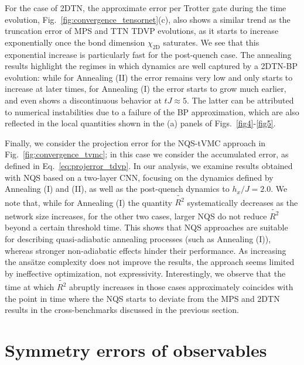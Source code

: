 \documentclass[aps,pra,reprint,amssymb,superscriptaddress]{revtex4-2}
\begin{document}
For the case of 2DTN, the approximate error per Trotter gate during the time evolution, Fig.~\ref{fig:convergence_tensornet}(c), 
also shows a similar trend as the truncation error of MPS and TTN TDVP evolutions, as it starts to increase exponentially once the bond dimension $\chi_\text{2D}$ saturates. We see that this exponential increase is particularly fast for the post-quench case. The annealing results highlight the regimes in which dynamics are well captured by a 2DTN-BP evolution: while for 
Annealing (II) the error remains very low and only starts to increase at later times, for Annealing (I) the error starts to grow much earlier, and even shows a discontinuous behavior at $tJ\approx 5$. The latter can be attributed to numerical instabilities due to a failure of the BP approximation, which are also reflected in the local quantities shown in the (a) panels of Figs.~\ref{fig4}-\ref{fig5}.

Finally, we consider the projection error for the NQS-tVMC approach in Fig.~\ref{fig:convergence_tvmc}; in this case we consider the accumulated error, as defined in Eq.~\eqref{eq:projerror_tdvp}.
In our analysis, we examine results obtained with NQS based on a two-layer CNN, focusing on the dynamics defined by Annealing (I) and (II), as well as the post-quench dynamics to $h_x/J = 2.0$. 
We note that, while for Annealing (I) the quantity $\tilde{R^2}$ systematically decreases as the network size increases, for the other two cases, larger NQS do not reduce $\tilde{R^2}$ beyond a certain threshold time. 
This shows that NQS approaches are suitable for describing quasi-adiabatic annealing processes (such as Annealing (I)), whereas stronger non-adiabatic effects hinder their performance. 
%
As increasing the ansätze complexity does not improve the results, the approach seems limited by ineffective optimization, not expressivity.
%
Interestingly, we observe that the time at which $\tilde{R^2}$ abruptly increases in those cases approximately coincides with the point in time where the NQS starts to deviate from the MPS and 2DTN results in the cross-benchmarks discussed in the previous section.



\section{ \label{sec6} Symmetry errors of observables}
\end{document}

